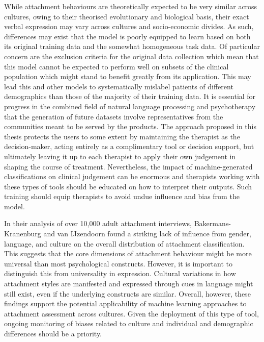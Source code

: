 \documentclass[12pt]{report}
\begin{document}
While attachment behaviours are theoretically expected to be very similar across cultures, owing to their theorised evolutionary and biological basis, their exact verbal expression may vary across cultures and socio-economic divides.
As such, differences may exist that the model is poorly equipped to learn based on both its original training data and the somewhat homogeneous task data.
Of particular concern are the exclusion criteria for the original data collection \cite{Talia2017} which mean that this model cannot be expected to perform well on subsets of the clinical population which might stand to benefit greatly from its application.
This may lead this and other models to systematically mislabel patients of different demographics than those of the majority of their training data.
It is essential for progress in the combined field of natural language processing and psychotherapy that the generation of future datasets involve representatives from the communities meant to be served by the products.
The approach proposed in this thesis protects the users to some extent by maintaining the therapist as the decision-maker, acting entirely as a complimentary tool or decision support, but ultimately leaving it up to each therapist to apply their own judgement in shaping the course of treatment.
Nevertheless, the impact of machine-generated classifications on clinical judgement can be enormous and therapists working with these types of tools should be educated on how to interpret their outputs.
Such training should equip therapists to avoid undue influence and bias from the model.

In their analysis of over 10,000 adult attachment interviews, Bakermans-Kranenburg and van IJzendoorn \citeyear{Bakermanskranenburg2009} found a striking lack of influence from gender, language, and culture on the overall distribution of attachment classification.
This suggests that the core dimensions of attachment behaviour might be more universal than most psychological constructs.
However, it is important to distinguish this from universality in expression.
Cultural variations in how attachment styles are manifested and expressed through cues in language might still exist, even if the underlying constructs are similar.
Overall, however, these findings support the potential applicability of machine learning approaches to attachment assessment across cultures.
Given the deployment of this type of tool, ongoing monitoring of biases related to culture and individual and demographic differences should be a priority.
\end{document}
